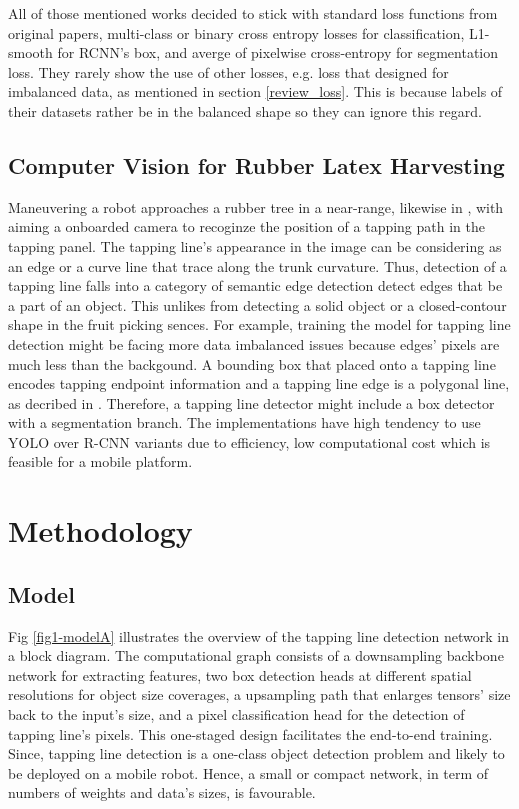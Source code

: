 \documentclass[default,pdflatex,iicol]{sn-jnl}%
\begin{document}
All of those mentioned works decided to stick with standard loss functions from original papers, multi-class or binary cross entropy losses for classification, L1-smooth for RCNN's box, and averge of pixelwise cross-entropy for segmentation loss. They rarely show the use of other losses, e.g. loss that designed for imbalanced data, as mentioned in section \ref{review_loss}. This is because labels of their datasets rather be in the balanced shape so they can ignore this regard.

\subsection{Computer Vision for Rubber Latex Harvesting}
Maneuvering a robot approaches a rubber tree in a near-range, likewise in \cite{zhang2019rubber, WANG2022103906}, with aiming a onboarded camera to recoginze the position of a tapping path in the tapping panel. The tapping line's appearance in the image can be considering as an edge or a curve line that trace along the trunk curvature. Thus, detection of a tapping line falls into a category of semantic edge detection \textemdash detect edges that be a part of an object. This unlikes from detecting a solid object or a closed-contour shape in the fruit picking sences. For example, training the model for tapping line detection might be facing more data imbalanced issues because edges' pixels are much less than the backgound. A bounding box that placed onto a tapping line encodes tapping endpoint information and a tapping line edge is a polygonal line, as decribed in \cite{Wongtanawijit_2021}. Therefore, a tapping line detector might include a box detector with a segmentation branch. The implementations have high tendency to use YOLO over R-CNN variants due to efficiency, low computational cost which is feasible for a mobile platform.


\section{Methodology}\label{sec-methodology}


\subsection{Model}\label{subsec-model}
Fig \ref{fig1-modelA} illustrates the overview of the tapping line detection network in a block diagram. The computational graph consists of a downsampling backbone network for extracting features, two box detection heads at different spatial resolutions for object size coverages, a upsampling path that enlarges tensors' size back to the input's size, and a pixel classification head for the detection of tapping line's pixels. This one-staged design facilitates the end-to-end training. Since, tapping line detection is a one-class object detection problem and likely to be deployed on a mobile robot. Hence, a small or compact network, in term of numbers of weights and data's sizes, is favourable.
\end{document}

